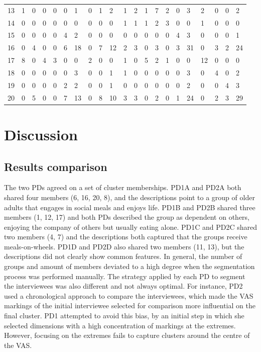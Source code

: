 \begin{table}[]
\begin{tabular}{l|llllllllllllllllllll}
13 & 1  & 0 & 0 & 0 & 0  & 1  & 0 & 1 & 2  & 1  & 2  & 1  & 7  & 2  & 0  & 3  & 2  & 0  & 0  & 2  \\
14 & 0  & 0 & 0 & 0 & 0  & 0  & 0 & 0 & 0  & 1  & 1  & 1  & 2  & 3  & 0  & 0  & 1  & 0  & 0  & 0  \\
15 & 0  & 0 & 0 & 0 & 4  & 2  & 0 & 0 & 0  & 0  & 0  & 0  & 0  & 0  & 4  & 3  & 0  & 0  & 0  & 1  \\
16 & 0  & 4 & 0 & 0 & 6  & 18 & 0 & 7 & 12 & 2  & 3  & 0  & 3  & 0  & 3  & 31 & 0  & 3  & 2  & 24 \\
17 & 8  & 0 & 4 & 3 & 0  & 0  & 2 & 0 & 0  & 1  & 0  & 5  & 2  & 1  & 0  & 0  & 12 & 0  & 0  & 0  \\
18 & 0  & 0 & 0 & 0 & 0  & 3  & 0 & 0 & 1  & 1  & 0  & 0  & 0  & 0  & 0  & 3  & 0  & 4  & 0  & 2  \\
19 & 0  & 0 & 0 & 0 & 2  & 2  & 0 & 0 & 1  & 0  & 0  & 0  & 0  & 0  & 0  & 2  & 0  & 0  & 4  & 3  \\
20 & 0  & 5 & 0 & 0 & 7  & 13 & 0 & 8 & 10 & 3  & 3  & 0  & 2  & 0  & 1  & 24 & 0  & 2  & 3  & 29
\end{tabular}
\end{table}

\section{Discussion}

\subsection{Results comparison}

The two PDs agreed on a set of cluster memberships. PD1A and PD2A both shared four members (6, 16, 20, 8), and the descriptions point to a group of older adults that engages in social meals and enjoys life. PD1B and PD2B shared three members (1, 12, 17) and both PDs described the group as dependent on others, enjoying the company of others but usually eating alone. PD1C and PD2C shared two members (4, 7) and the descriptions both captured that the groups receive meals-on-wheels. PD1D and PD2D also shared two members (11, 13), but the descriptions did not clearly show common features. In general, the number of groups and amount of members deviated to a high degree when the segmentation process was performed manually. The strategy applied by each PD to segment the interviewees was also different and not always optimal. For instance, PD2 used a chronological approach to compare the interviewees, which made the VAS markings of the initial interviewee selected for comparison more influential on the final cluster. PD1 attempted to avoid this bias, by an initial step in which she selected dimensions with a high concentration of markings at the extremes. However, focusing on the extremes fails to capture clusters around the centre of the VAS.

